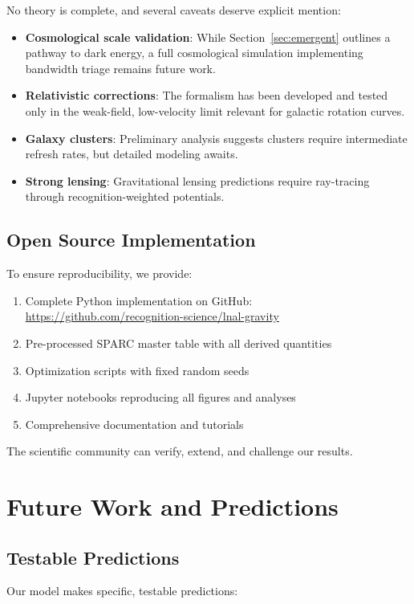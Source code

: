 \documentclass[twocolumn,prd,amsmath,amssymb,aps,superscriptaddress,nofootinbib]{revtex4-2}
\begin{document}
No theory is complete, and several caveats deserve explicit mention:
\begin{itemize}
  \item \textbf{Cosmological scale validation}: While Section~\ref{sec:emergent} outlines a pathway to dark energy, a full cosmological simulation implementing bandwidth triage remains future work.
  \item \textbf{Relativistic corrections}: The formalism has been developed and tested only in the weak-field, low-velocity limit relevant for galactic rotation curves.
  \item \textbf{Galaxy clusters}: Preliminary analysis suggests clusters require intermediate refresh rates, but detailed modeling awaits.
  \item \textbf{Strong lensing}: Gravitational lensing predictions require ray-tracing through recognition-weighted potentials.
\end{itemize}

\subsection{Open Source Implementation}

To ensure reproducibility, we provide:
\begin{enumerate}
\item Complete Python implementation on GitHub: \url{https://github.com/recognition-science/lnal-gravity}
\item Pre-processed SPARC master table with all derived quantities
\item Optimization scripts with fixed random seeds
\item Jupyter notebooks reproducing all figures and analyses
\item Comprehensive documentation and tutorials
\end{enumerate}

The scientific community can verify, extend, and challenge our results.

\section{Future Work and Predictions}
\label{sec:future}

\subsection{Testable Predictions}

Our model makes specific, testable predictions:
\end{document}
